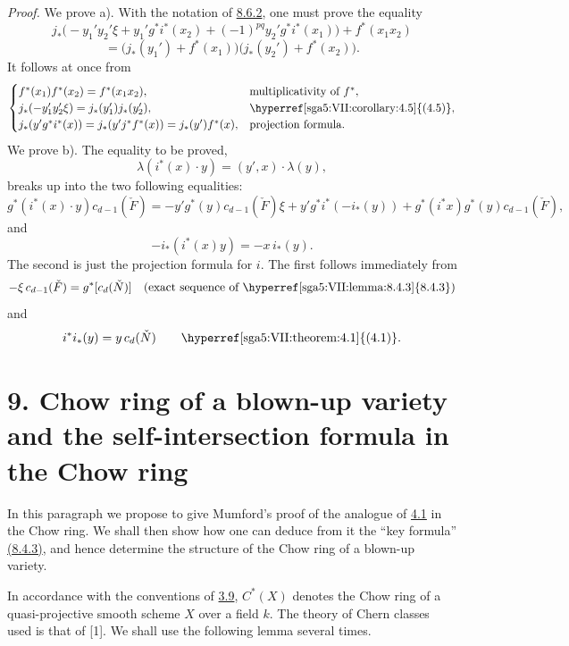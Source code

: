\documentclass[11pt]{article}
\begin{document}
\emph{Proof.} We prove a). With the notation of \hyperref[sga5:VII:equation:8.6.2]{8.6.2}, one must prove the equality
\[
j_*\bigl(-y_1'y_2'\xi+y_1'g^*i^*(x_2)+(-1)^{pq}y_2'g^*i^*(x_1)\bigr)+f^*(x_1x_2)
\]
\[
=\bigl(j_*(y_1')+f^*(x_1)\bigr)\bigl(j_*(y_2')+f^*(x_2)\bigr).
\]
It follows at once from
\[
\begin{cases}
f^*(x_1)f^*(x_2)=f^*(x_1x_2),&\text{multiplicativity of }f^*,\\
j_*(-y_1'y_2'\xi)=j_*(y_1')j_*(y_2'),&\text{\hyperref[sga5:VII:corollary:4.5]{(4.5)}},\\
j_*(y'g^*i^*(x))=j_*(y'j^*f^*(x))=j_*(y')f^*(x),&\text{projection formula}.
\end{cases}
\]
We prove b). The equality to be proved,
\[
\lambda(i^*(x)\cdot y)=(y',x)\cdot\lambda(y),
\]
breaks up into the two following equalities:
\[
g^*(i^*(x)\cdot y)c_{d-1}(\check F)
=
-y'g^*(y)c_{d-1}(\check F)\xi
+y'g^*i^*(-i_*(y))
+g^*(i^*x)g^*(y)c_{d-1}(\check F),
\]
and
\[
-i_*(i^*(x)y)=-x\,i_*(y).
\]
The second is just the projection formula for $i$. The first follows immediately from
\[
-\xi\,c_{d-1}(\check F)=g^*[c_d(\check N)]
\quad\text{(exact sequence of \hyperref[sga5:VII:lemma:8.4.3]{8.4.3})}
\]
and
\[
i^*i_*(y)=y\,c_d(\check N)\qquad\text{\hyperref[sga5:VII:theorem:4.1]{(4.1)}}.
\]

\section*{9. Chow ring of a blown-up variety and the self-intersection formula in the Chow ring}\label{sga5:VII:section:9}

In this paragraph we propose to give Mumford's proof of the analogue of \hyperref[sga5:VII:theorem:4.1]{4.1} in the Chow ring. We shall then show how one can deduce from it the ``key formula'' \hyperref[sga5:VII:lemma:8.4.3]{(8.4.3)}, and hence determine the structure of the Chow ring of a blown-up variety.

In accordance with the conventions of \hyperref[sga5:VII:subsubsection:3.9]{3.9}, $C^*(X)$ denotes the Chow ring of a quasi-projective smooth scheme $X$ over a field $k$. The theory of Chern classes used is that of [1]. We shall use the following lemma several times.
\end{document}
